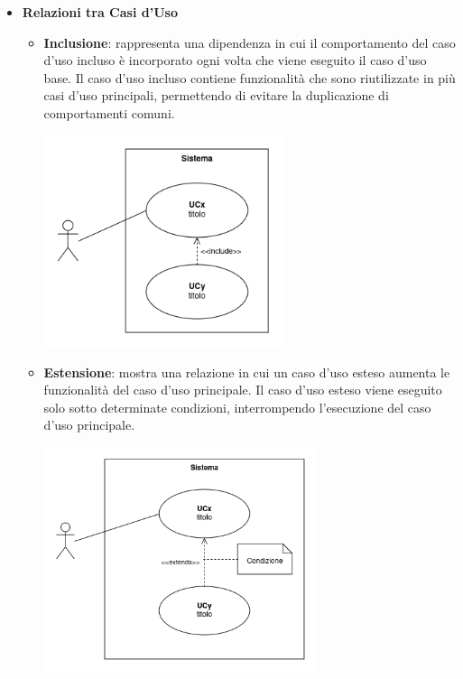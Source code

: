 \begin{itemize}
	\item \textbf{Relazioni tra Casi d'Uso}
	      \begin{itemize}
		      \item \textbf{Inclusione}: rappresenta una dipendenza in cui il comportamento del caso d'uso incluso è incorporato ogni volta che viene eseguito il caso d'uso base. Il caso d'uso incluso contiene funzionalità che sono riutilizzate in più casi d'uso principali, permettendo di evitare la duplicazione di comportamenti comuni.
		            \begin{center}
			            \includegraphics*[width=7cm]{../../../images/norme_di_progetto/include.png}
		            \end{center}
		      \item \textbf{Estensione}: mostra una relazione in cui un caso d'uso esteso aumenta le funzionalità del caso d'uso principale. Il caso d'uso esteso viene eseguito solo sotto determinate condizioni, interrompendo l'esecuzione del caso d'uso principale.
		            \begin{center}
			            \includegraphics*[width=8cm]{../../../images/norme_di_progetto/estensione.png}

\end{center}
\end{itemize}
\end{itemize}
